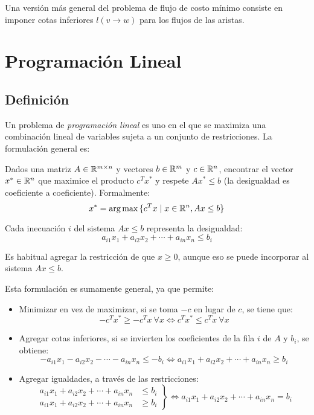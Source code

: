Una versión más general del problema de flujo de costo mínimo consiste en imponer cotas inferiores $l(v \rightarrow w)$ para los flujos de las aristas.

\section{Programación Lineal}
\label{programacion-lineal}

\subsection{Definición}

Un problema de \textit{programación lineal} es uno en el que se maximiza una combinación lineal de variables sujeta a un conjunto de restricciones. La formulación general es:

\begin{problema}
    Dados una matriz $A \in \mathbb{R}^{m \times n}$ y vectores $b \in \mathbb{R}^m$ y $c \in \mathbb{R}^n$, encontrar el vector $x^* \in \mathbb{R}^n$ que maximice el producto $c^T x^*$ y respete $Ax^* \leq b$ (la desigualdad es coeficiente a coeficiente). Formalmente:
    $$x^* = \arg\max{\{c^T x \mid x \in \mathbb{R}^n, Ax \leq b\}}$$
\end{problema}

Cada inecuación $i$ del sistema $Ax \leq b$ representa la desigualdad:
$$a_{i1} x_1 + a_{i2} x_2 + \cdots + a_{in} x_n \leq b_i$$

Es habitual agregar la restricción de que $x \geq 0$, aunque eso se puede incorporar al sistema $Ax \leq b$.

Esta formulación es sumamente general, ya que permite:
\begin{itemize}
    \item Minimizar en vez de maximizar, si se toma $-c$ en lugar de $c$, se tiene que:
          $$-c^T x^* \geq -c^T x\ \forall x \iff c^T x^* \leq c^T x\ \forall x$$
    \item Agregar cotas inferiores, si se invierten los coeficientes de la fila $i$ de $A$ y $b_i$, se obtiene:
          $$-a_{i1} x_1 - a_{i2} x_2 - \cdots - a_{in} x_n \leq -b_i \iff a_{i1} x_1 + a_{i2} x_2 + \cdots + a_{in} x_n \geq b_i$$
    \item Agregar igualdades, a través de las restricciones:
          \begin{equation*}
              \left.\begin{aligned}
                  a_{i1} x_1 + a_{i2} x_2 + \cdots + a_{in} x_n & \leq b_i \\
                  a_{i1} x_1 + a_{i2} x_2 + \cdots + a_{in} x_n & \geq b_i
              \end{aligned}\right\} \iff a_{i1} x_1 + a_{i2} x_2 + \cdots + a_{in} x_n = b_i
          \end{equation*}
\end{itemize}

